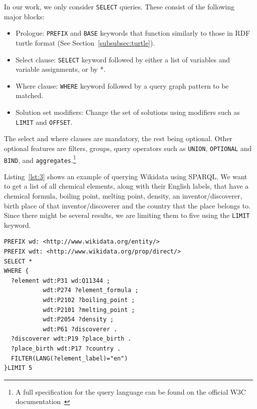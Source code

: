 In our work, we only consider \texttt{SELECT} queries. These consist of the following major blocks:
\begin{itemize}
\item Prologue: \texttt{PREFIX} and \texttt{BASE} keywords that function similarly to those in RDF turtle format (See Section~\ref{subsubsec:turtle}).
\item Select clause: \texttt{SELECT} keyword followed by either a list of variables and variable assignments, or by *.
\item Where clause: \texttt{WHERE} keyword followed by a query graph pattern to be matched.
\item Solution set modifiers: Change the set of solutions using modifiers such as \texttt{LIMIT} and \texttt{OFFSET}.
\end{itemize}

The select and where clauses are mandatory, the rest being optional. Other optional features are filters, groups, query operators such as \texttt{UNION}, \texttt{OPTIONAL} and \texttt{BIND}, and \texttt{aggregates}.\footnote{A full specification for the query language can be found on the official W3C documentation~\cite{Seaborne}}

Listing~\ref{lst:3} shows an example of querying Wikidata using SPARQL. We want to get a list of all chemical elements, along with their English labels, that have a chemical formula, boiling point, melting point, density, an inventor/discoverer, birth place of that inventor/discoverer and the country that the place belongs to. Since there might be several results, we are limiting them to five using the \texttt{LIMIT} keyword. 


\begin{minipage}{\linewidth}
\begin{lstlisting}[label=lst:3, caption={Querying Wikidata with SPARQL}, language=SPARQL]
PREFIX wd: <http://www.wikidata.org/entity/>
PREFIX wdt: <http://www.wikidata.org/prop/direct/>
SELECT *
WHERE {
  ?element wdt:P31 wd:Q11344 ;
           wdt:P274 ?element_formula ; 
           wdt:P2102 ?boiling_point ;
           wdt:P2101 ?melting_point ;
           wdt:P2054 ?density ;
           wdt:P61 ?discoverer .
  ?discoverer wdt:P19 ?place_birth .
  ?place_birth wdt:P17 ?country .
  FILTER(LANG(?element_label)="en")
}LIMIT 5
\end{lstlisting}
\end{minipage}

